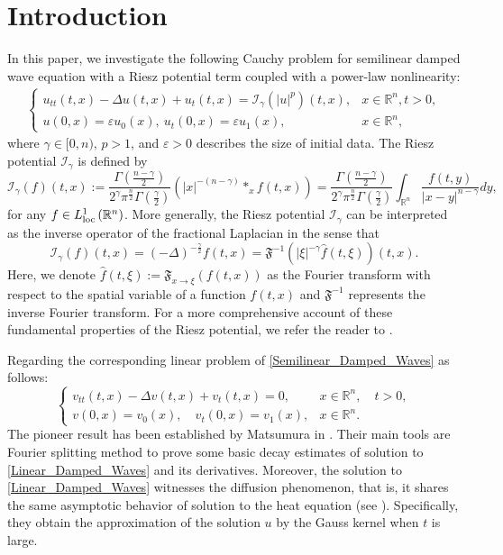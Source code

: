 \documentclass[11pt,reqno]{amsart}
\begin{document}
\section{Introduction}
In this paper, we investigate the following Cauchy problem for semilinear damped wave equation with a Riesz potential term coupled with a power-law nonlinearity:
\begin{align}\label{Semilinear_Damped_Waves}
\begin{cases}
u_{tt}(t,x)-\Delta u(t,x)+u_t(t,x)=\mathcal{I}_\gamma(|u|^p)(t,x), &x\in \mathbb{R}^n, t>0,\\
u(0,x)=\varepsilon u_0(x),\ u_t(0,x)=\varepsilon u_1(x),&x\in \mathbb{R}^n,
\end{cases}
\end{align}
where $\gamma \in [0, n), \,p>1$, and $\varepsilon>0$ describes the size of initial data. The Riesz potential $\mathcal{I}_\gamma$ is defined by
$$
\mathcal{I}_\gamma (f)(t,x):= \frac{\Gamma\left(\frac{n-\gamma}{2}\right)}{2^\gamma \pi^\frac{n}{2} \Gamma\left(\frac{\gamma}{2}\right)}\left(|x|^{-(n-\gamma)} \ast_x f(t,x)\right)= \frac{\Gamma\left(\frac{n-\gamma}{2}\right)}{2^\gamma \pi^\frac{n}{2} \Gamma\left(\frac{\gamma}{2}\right)} \int_{\mathbb{R}^n} \displaystyle\frac{f(t,y)}{|x-y|^{n-\gamma}} d y,
$$
for any $f \in L_{\rm loc}^1\left(\mathbb{R}^n\right)$.
More generally, the Riesz potential $\mathcal{I}_\gamma$ can be interpreted as the inverse operator of the fractional Laplacian in the sense that $$\mathcal{I}_\gamma (f)(t,x) = (-\Delta)^{-\frac{\gamma}{2}} f(t,x)=\mathfrak{F}^{-1}(|\xi|^{-\gamma} \widehat{f}(t,\xi))(t,x).$$ Here, we denote $\widehat{f}(t,\xi):= \mathfrak{F}_{x\rightarrow \xi}(f(t,x))$ as the Fourier transform with respect to the spatial variable of a function $f(t,x)$ and $\mathfrak{F}^{-1}$ represents the inverse Fourier transform. For a more comprehensive account of these fundamental properties of the Riesz potential, we refer the reader to \cite{Landkof1972, Stein1970}.

Regarding the corresponding linear problem of \eqref{Semilinear_Damped_Waves} as follows:
\begin{equation}\label{Linear_Damped_Waves}
\begin{cases}
v_{tt}(t,x)-\Delta v(t,x)+v_t(t,x)=0, &x\in \mathbb{R}^n, \quad t>0,\\
v(0,x)=v_0(x),\quad v_t(0,x)=v_1(x),&x\in \mathbb{R}^n.
\end{cases}
\end{equation}
The pioneer result has been established by Matsumura in \cite{Matsumura1976}. Their main tools are Fourier splitting method to prove some basic decay estimates of solution to \eqref{Linear_Damped_Waves} and its derivatives. Moreover, the solution to \eqref{Linear_Damped_Waves} witnesses the diffusion phenomenon, that is, it shares the same asymptotic behavior of solution to the heat equation (see \cite{Radu2011,DabbiccoEbert2014}). Specifically, they obtain the approximation of the solution $u$ by the Gauss kernel when $t$ is large.
\end{document}
